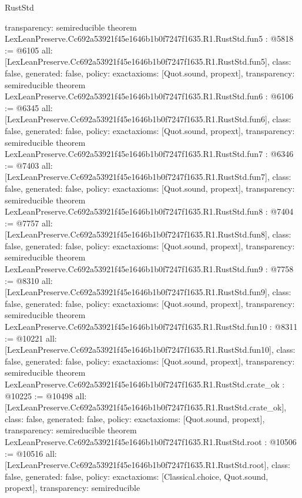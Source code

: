 \begin{lexlean}{RustStd}
\begin{coremodule}
{  transparency: semireducible
}
theorem LexLeanPreserve.Cc692a53921f45e1646b1b0f7247f1635.R1.RustStd.fun5 : @5818 := @6105 {
  all: [LexLeanPreserve.Cc692a53921f45e1646b1b0f7247f1635.R1.RustStd.fun5],
  class: false,
  generated: false,
  policy: exact{axioms: [Quot.sound, propext]},
  transparency: semireducible
}
theorem LexLeanPreserve.Cc692a53921f45e1646b1b0f7247f1635.R1.RustStd.fun6 : @6106 := @6345 {
  all: [LexLeanPreserve.Cc692a53921f45e1646b1b0f7247f1635.R1.RustStd.fun6],
  class: false,
  generated: false,
  policy: exact{axioms: [Quot.sound, propext]},
  transparency: semireducible
}
theorem LexLeanPreserve.Cc692a53921f45e1646b1b0f7247f1635.R1.RustStd.fun7 : @6346 := @7403 {
  all: [LexLeanPreserve.Cc692a53921f45e1646b1b0f7247f1635.R1.RustStd.fun7],
  class: false,
  generated: false,
  policy: exact{axioms: [Quot.sound, propext]},
  transparency: semireducible
}
theorem LexLeanPreserve.Cc692a53921f45e1646b1b0f7247f1635.R1.RustStd.fun8 : @7404 := @7757 {
  all: [LexLeanPreserve.Cc692a53921f45e1646b1b0f7247f1635.R1.RustStd.fun8],
  class: false,
  generated: false,
  policy: exact{axioms: [Quot.sound, propext]},
  transparency: semireducible
}
theorem LexLeanPreserve.Cc692a53921f45e1646b1b0f7247f1635.R1.RustStd.fun9 : @7758 := @8310 {
  all: [LexLeanPreserve.Cc692a53921f45e1646b1b0f7247f1635.R1.RustStd.fun9],
  class: false,
  generated: false,
  policy: exact{axioms: [Quot.sound, propext]},
  transparency: semireducible
}
theorem LexLeanPreserve.Cc692a53921f45e1646b1b0f7247f1635.R1.RustStd.fun10 : @8311 := @10221 {
  all: [LexLeanPreserve.Cc692a53921f45e1646b1b0f7247f1635.R1.RustStd.fun10],
  class: false,
  generated: false,
  policy: exact{axioms: [Quot.sound, propext]},
  transparency: semireducible
}
theorem LexLeanPreserve.Cc692a53921f45e1646b1b0f7247f1635.R1.RustStd.crate_ok : @10225 := @10498 {
  all: [LexLeanPreserve.Cc692a53921f45e1646b1b0f7247f1635.R1.RustStd.crate_ok],
  class: false,
  generated: false,
  policy: exact{axioms: [Quot.sound, propext]},
  transparency: semireducible
}
theorem LexLeanPreserve.Cc692a53921f45e1646b1b0f7247f1635.R1.RustStd.root : @10506 := @10516 {
  all: [LexLeanPreserve.Cc692a53921f45e1646b1b0f7247f1635.R1.RustStd.root],
  class: false,
  generated: false,
  policy: exact{axioms: [Classical.choice, Quot.sound, propext]},
  transparency: semireducible
}


\end{coremodule}
\end{lexlean}

